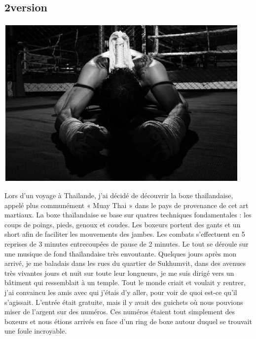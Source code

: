 \subsection{2\ieme version}
\paragraph{}
\begin{center}
\includegraphics[scale=0.7]{Thai1.jpg}
\end{center}
Lors d'un voyage à Thaïlande, j'ai décidé de découvrir la boxe thaïlandaise, appelé plus communément « Muay Thai » dans le pays de provenance de cet art martiaux. La boxe thaïlandaise se base sur quatres techniques fondamentales : les coups de poings, pieds, genoux et coudes. Les boxeurs portent des gants et un short afin de faciliter les mouvements des jambes. Les combats s'effectuent en 5 reprises de 3 minutes entrecoupées de pause de 2 minutes. Le tout se déroule sur une musique de fond thaïlandaise très envoutante.
Quelques jours après mon arrivé, je me baladais dans les rues du quartier de Sukhumvit, dans des avenues très vivantes jours et nuit sur toute leur longueurs, je me suis dirigé vers un bâtiment qui ressemblait à un temple. Tout le monde criait et voulait y rentrer, j'ai convaincu les amis avec qui j'étais d'y aller, pour voir de quoi est-ce qu'il s'agissait.
L'entrée était gratuite, mais il y avait des guichets où nous pouvions miser de l'argent sur des numéros. Ces numéros étaient tout simplement des boxeurs et nous étions arrivés en face d'un ring de boxe autour duquel se trouvait une foule incroyable.
